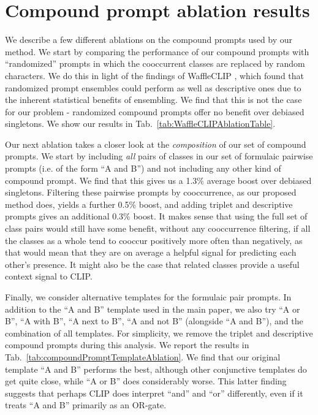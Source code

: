 \section{Compound prompt ablation results}
\label{sec:compound_prompt_ablation_results}




We describe a few different ablations on the compound prompts used by our method. We start by comparing the performance of our compound prompts with ``randomized'' prompts in which the cooccurrent classes are replaced by random characters. We do this in light of the findings of WaffleCLIP \cite{WaffleCLIP}, which found that randomized prompt ensembles could perform as well as descriptive ones due to the inherent statistical benefits of ensembling. We find that this is not the case for our problem - randomized compound prompts offer no benefit over debiased singletons. We show our results in Tab.~\ref{tab:WaffleCLIPAblationTable}.



Our next ablation takes a closer look at the \textit{composition} of our set of compound prompts. We start by including \textit{all} pairs of classes in our set of formulaic pairwise prompts (i.e. of the form ``A and B'') and not including any other kind of compound prompt. We find that this gives us a 1.3\% average boost over debiased singletons. Filtering these pairwise prompts by cooccurrence, as our proposed method does, yields a further 0.5\% boost, and adding triplet and descriptive prompts gives an additional 0.3\% boost. It makes sense that using the full set of class pairs would still have some benefit, without any cooccurrence filtering, if all the classes as a whole tend to cooccur positively more often than negatively, as that would mean that they are on average a helpful signal for predicting each other's presence. It might also be the case that related classes provide a useful context signal to CLIP.



Finally, we consider alternative templates for the formulaic pair prompts. In addition to the ``A and B'' template used in the main paper, we also try ``A or B'', ``A with B'', ``A next to B'', ``A and not B'' (alongside ``A and B''), and the combination of all templates. For simplicity, we remove the triplet and descriptive compound prompts during this analysis. We report the results in Tab.~\ref{tab:compoundPromptTemplateAblation}. We find that our original template ``A and B'' performs the best, although other conjunctive templates do get quite close, while ``A or B'' does considerably worse. This latter finding suggests that perhaps CLIP does interpret ``and'' and ``or'' differently, even if it treats ``A and B'' primarily as an OR-gate. 

